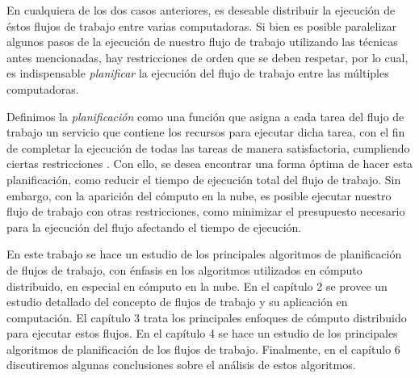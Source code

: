 En cualquiera de los dos casos anteriores, es deseable distribuir la ejecución de éstos flujos de trabajo entre varias computadoras. Si bien es posible paralelizar algunos pasos de la ejecución de nuestro flujo de trabajo utilizando las técnicas antes mencionadas, hay restricciones de orden que se deben respetar, por lo cual, es indispensable \emph{planificar} la ejecución del flujo de trabajo entre las múltiples computadoras.

Definimos la \emph{planificación} como una función que asigna a cada tarea del flujo de trabajo un servicio que contiene los recursos para ejecutar dicha tarea, con el fin de completar la ejecución de todas las tareas de manera satisfactoria, cumpliendo ciertas restricciones \cite{wieczorek2009towards}. Con ello, se desea encontrar una forma óptima de hacer esta planificación, como reducir el tiempo de ejecución total del flujo de trabajo. Sin embargo, con la aparición del cómputo en la nube, es posible ejecutar nuestro flujo de trabajo con otras restricciones, como minimizar el presupuesto necesario para la ejecución del flujo afectando el tiempo de ejecución.



En este trabajo se hace un estudio de los principales algoritmos de planificación de flujos de trabajo, con énfasis en los algoritmos utilizados en cómputo distribuido, en especial en cómputo en la nube. En el capítulo 2 se provee un estudio detallado del concepto de flujos de trabajo y su aplicación en computación. El capítulo 3 trata los principales enfoques de cómputo distribuido para ejecutar estos flujos. En el capítulo 4 se hace un estudio de los principales algoritmos de planificación de los flujos de trabajo. Finalmente, en el capítulo 6 discutiremos algunas conclusiones sobre el análisis de estos algoritmos.
